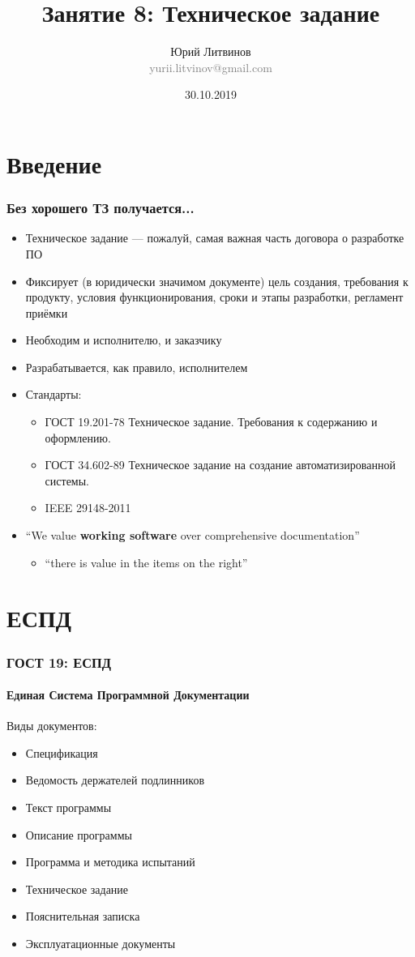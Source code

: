 \documentclass[xetex,mathserif,serif]{beamer}
\title{Занятие 8: Техническое задание}
\author[Юрий Литвинов]{Юрий Литвинов\\\small{\textcolor{gray}{yurii.litvinov@gmail.com}}}
\date{30.10.2019}
\begin{document}
	\frame{\titlepage}

	\section{Введение}

	\begin{frame}
		\frametitle{Без хорошего ТЗ получается...}
		\begin{itemize}
			\item Техническое задание --- пожалуй, самая важная часть договора о разработке ПО
			\item Фиксирует (в юридически значимом документе) цель создания, требования к продукту, условия функционирования, сроки и этапы разработки, регламент приёмки
			\item Необходим и исполнителю, и заказчику
			\item Разрабатывается, как правило, исполнителем
			\item Стандарты:
			\begin{itemize}
				\item ГОСТ 19.201-78 Техническое задание. Требования к содержанию и оформлению.
				\item ГОСТ 34.602-89 Техническое задание на создание автоматизированной системы.
				\item IEEE 29148-2011
			\end{itemize}
			\item ``We value \textbf{working software} over comprehensive documentation''
			\begin{itemize}
				\item ``there is value in the items on the right''
			\end{itemize}
		\end{itemize}
	\end{frame}

	\section{ЕСПД}

	\begin{frame}
		\frametitle{ГОСТ 19: ЕСПД}
		\framesubtitle{Единая Система Программной Документации}
		Виды документов:
		\begin{itemize}
			\item Спецификация
			\item Ведомость держателей подлинников
			\item Текст программы
			\item Описание программы
			\item Программа и методика испытаний
			\item Техническое задание
			\item Пояснительная записка
			\item Эксплуатационные документы
		\end{itemize}
	\end{frame}
\end{document}
